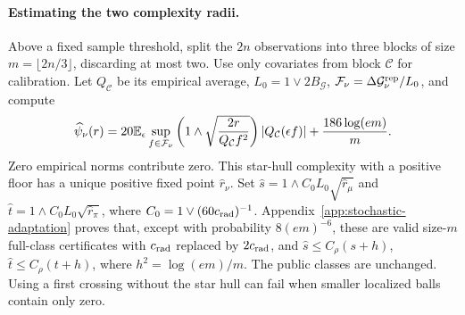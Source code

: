 \documentclass{article}
\theoremstyle{definition}
\theoremstyle{remark}
\begin{document}
\paragraph{Estimating the two complexity radii.}
Above a fixed sample threshold, split the \(2n\) observations into three
blocks of size \(m=\lfloor2n/3\rfloor\), discarding at most two.
Use only covariates from block \(\mathcal C\) for calibration.
Let \(Q_{\mathcal C}\) be its empirical average,
\(L_0=1\vee2B_{\mathcal G}\),
\(\mathcal F_\nu=\Delta\mathcal G_\nu^{\rm rep}/L_0\), and compute
\[
 \widehat\psi_\nu(r)=20\mathbb E_\epsilon\sup_{f\in\mathcal F_\nu}
 \left(1\wedge\sqrt{\frac{2r}{Q_{\mathcal C}f^2}}\right)
 |Q_{\mathcal C}(\epsilon f)|+\frac{186\log(em)}m .
\]
Zero empirical norms contribute zero. This star-hull complexity with a
positive floor has a unique positive fixed point \(\widehat r_\nu\).
Set \(\widehat s=1\wedge C_0L_0\sqrt{\widehat r_\mu}\) and
\(\widehat t=1\wedge C_0L_0\sqrt{\widehat r_\pi}\),
where \(C_0=1\vee(60c_{\rm rad})^{-1}\).
Appendix~\ref{app:stochastic-adaptation} proves that, except with probability
\(8(em)^{-6}\), these are valid size-\(m\) full-class certificates with
\(c_{\rm rad}\) replaced by \(2c_{\rm rad}\), and
\(\widehat s\le C_\rho(s+h)\), \(\widehat t\le C_\rho(t+h)\),
where \(h^2=\log(em)/m\). The public classes are unchanged. Using a first crossing without the
star hull can fail when smaller localized balls contain only zero.
\end{document}
